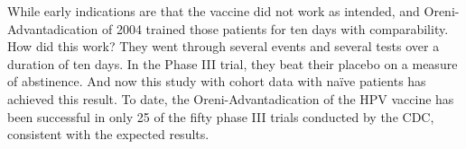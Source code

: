 \documentclass{article}
\begin{document}
While early indications are that the vaccine did not work as intended, and Oreni-Advantadication of 2004 trained those patients for ten days with comparability. How did this work? They went through several events and several tests over a duration of ten days. In the Phase III trial, they beat their placebo on a measure of abstinence. And now this study with cohort data with naïve patients has achieved this result. To date, the Oreni-Advantadication of the HPV vaccine has been successful in only 25 of the fifty phase III trials conducted by the CDC, consistent with the expected results.
\end{document}
